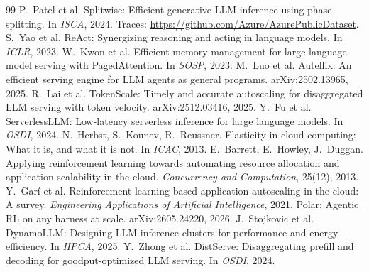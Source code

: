 \documentclass[sigconf,nonacm]{acmart}
\begin{document}

\begin{thebibliography}{99}
\small
{} P.~Patel et al. Splitwise: Efficient generative LLM
inference using phase splitting. In \emph{ISCA}, 2024. Traces:
\url{https://github.com/Azure/AzurePublicDataset}.
 S.~Yao et al. ReAct: Synergizing reasoning and acting in
language models. In \emph{ICLR}, 2023.
 W.~Kwon et al. Efficient memory management for large
language model serving with PagedAttention. In \emph{SOSP}, 2023.
 M.~Luo et al. Autellix: An efficient serving engine for
LLM agents as general programs. arXiv:2502.13965, 2025.
 R.~Lai et al. TokenScale: Timely and accurate
autoscaling for disaggregated LLM serving with token velocity.
arXiv:2512.03416, 2025.
 Y.~Fu et al. ServerlessLLM: Low-latency serverless
inference for large language models. In \emph{OSDI}, 2024.
 N.~Herbst, S.~Kounev, R.~Reussner. Elasticity in cloud
computing: What it is, and what it is not. In \emph{ICAC}, 2013.
 E.~Barrett, E.~Howley, J.~Duggan. Applying reinforcement
learning towards automating resource allocation and application scalability
in the cloud. \emph{Concurrency and Computation}, 25(12), 2013.
 Y.~Gar\'i et al. Reinforcement learning-based application
autoscaling in the cloud: A survey. \emph{Engineering Applications of
Artificial Intelligence}, 2021.
 Polar: Agentic RL on any harness at scale.
arXiv:2605.24220, 2026.
 J.~Stojkovic et al. DynamoLLM: Designing LLM inference
clusters for performance and energy efficiency. In \emph{HPCA}, 2025.
 Y.~Zhong et al. DistServe: Disaggregating prefill and
decoding for goodput-optimized LLM serving. In \emph{OSDI}, 2024.
\end{thebibliography}
\end{document}
